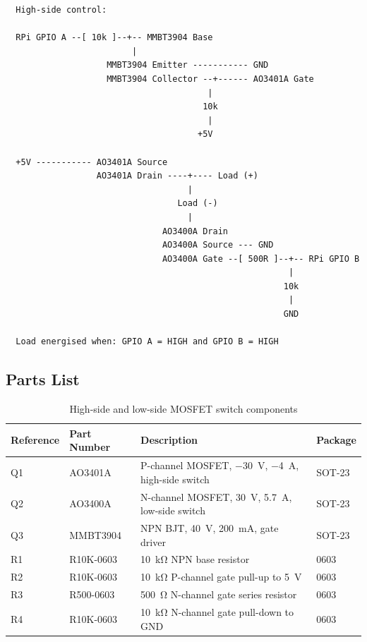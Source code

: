 \begin{verbatim}
  High-side control:

  RPi GPIO A --[ 10k ]--+-- MMBT3904 Base
                         |
                    MMBT3904 Emitter ----------- GND
                    MMBT3904 Collector --+------ AO3401A Gate
                                        |
                                       10k
                                        |
                                      +5V

  +5V ----------- AO3401A Source
                  AO3401A Drain ----+---- Load (+)
                                    |
                                  Load (-)
                                    |
                               AO3400A Drain
                               AO3400A Source --- GND
                               AO3400A Gate --[ 500R ]--+-- RPi GPIO B
                                                        |
                                                       10k
                                                        |
                                                       GND

  Load energised when: GPIO A = HIGH and GPIO B = HIGH
\end{verbatim}

\subsection{Parts List}

\begin{table}[h]
\centering
\begin{tabular}{llll}
\hline
\textbf{Reference} & \textbf{Part Number} & \textbf{Description} & \textbf{Package} \\
\hline
Q1 & AO3401A   & P-channel MOSFET, \SI{-30}{\volt}, \SI{-4}{\ampere}, high-side switch & SOT-23 \\
Q2 & AO3400A   & N-channel MOSFET, \SI{30}{\volt}, \SI{5.7}{\ampere}, low-side switch  & SOT-23 \\
Q3 & MMBT3904  & NPN BJT, \SI{40}{\volt}, \SI{200}{\milli\ampere}, gate driver         & SOT-23 \\
R1 & R10K-0603 & \SI{10}{\kilo\ohm} NPN base resistor                                  & 0603   \\
R2 & R10K-0603 & \SI{10}{\kilo\ohm} P-channel gate pull-up to \SI{5}{\volt}            & 0603   \\
R3 & R500-0603 & \SI{500}{\ohm} N-channel gate series resistor                         & 0603   \\
R4 & R10K-0603 & \SI{10}{\kilo\ohm} N-channel gate pull-down to GND                   & 0603   \\
\hline
\end{tabular}
\caption{High-side and low-side MOSFET switch components}
\label{tab:highside_parts}
\end{table}

